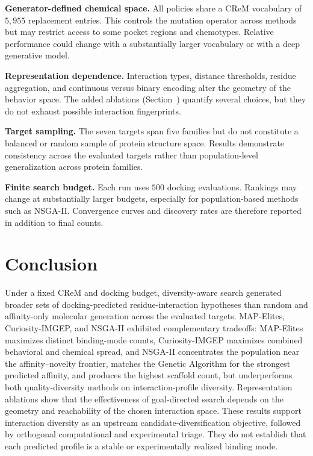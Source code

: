 \documentclass[journal=jcisd8,manuscript=article]{achemso}
\begin{document}
\textbf{Generator-defined chemical space.} All policies share a CReM vocabulary of $5{,}955$ replacement entries. This controls the mutation operator across methods but may restrict access to some pocket regions and chemotypes. Relative performance could change with a substantially larger vocabulary or with a deep generative model.\cite{hoogeboom2022equivariant,corso2023diffdock}

\textbf{Representation dependence.} Interaction types, distance thresholds, residue aggregation, and continuous versus binary encoding alter the geometry of the behavior space. The added ablations (Section~) quantify several choices, but they do not exhaust possible interaction fingerprints.

\textbf{Target sampling.} The seven targets span five families but do not constitute a balanced or random sample of protein structure space. Results demonstrate consistency across the evaluated targets rather than population-level generalization across protein families.

\textbf{Finite search budget.} Each run uses $500$ docking evaluations. Rankings may change at substantially larger budgets, especially for population-based methods such as NSGA-II. Convergence curves and discovery rates are therefore reported in addition to final counts.


\section{Conclusion}

Under a fixed CReM and docking budget, diversity-aware search generated broader sets of docking-predicted residue-interaction hypotheses than random and affinity-only molecular generation across the evaluated targets. MAP-Elites, Curiosity-IMGEP, and NSGA-II exhibited complementary tradeoffs: MAP-Elites maximizes distinct binding-mode counts, Curiosity-IMGEP maximizes combined behavioral and chemical spread, and NSGA-II concentrates the population near the affinity--novelty frontier, matches the Genetic Algorithm for the strongest predicted affinity, and produces the highest scaffold count, but underperforms both quality-diversity methods on interaction-profile diversity. Representation ablations show that the effectiveness of goal-directed search depends on the geometry and reachability of the chosen interaction space. These results support interaction diversity as an upstream candidate-diversification objective, followed by orthogonal computational and experimental triage. They do not establish that each predicted profile is a stable or experimentally realized binding mode.
\end{document}
